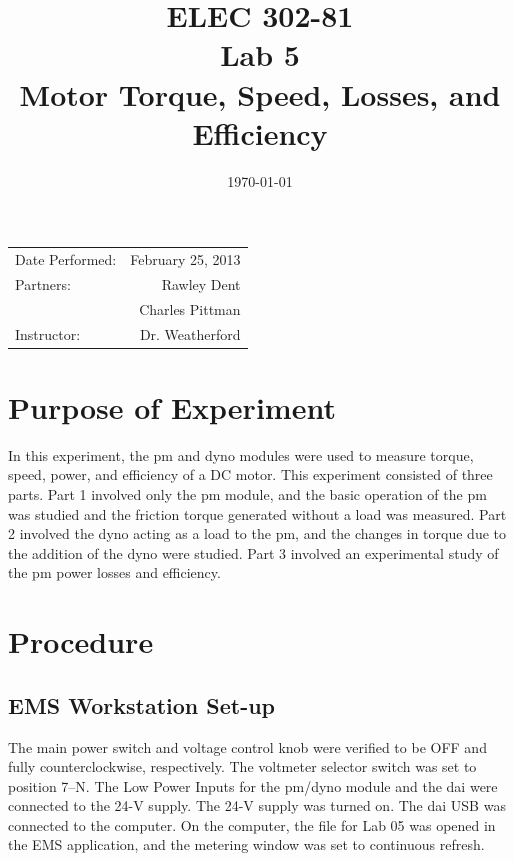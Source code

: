\documentclass{article}
\author{}
\title{ELEC 302-81\\ Lab 5\\ Motor Torque, Speed, Losses, and Efficiency}
\date{\today}
\begin{document}
\maketitle

\begin{center}
  \begin{tabular}{lr}
    Date Performed: & February 25, 2013 \\
    Partners: & Rawley Dent \\
              & Charles Pittman \\
    Instructor: & Dr. Weatherford
  \end{tabular}
\end{center}

\pagebreak


\section{Purpose of Experiment}

In this experiment, the \gls{pm} and \gls{dyno} modules were used to measure
torque, speed, power, and efficiency of a DC motor. This experiment consisted
of three parts. Part 1 involved only the \gls{pm} module, and the basic
operation of the \gls{pm} was studied and the friction torque generated without
a load was measured. Part 2 involved the \gls{dyno} acting as a load to the
\gls{pm}, and the changes in torque due to the addition of the \gls{dyno} were
studied. Part 3 involved an experimental study of the \gls{pm} power losses and
efficiency.

\section{Procedure}

\subsection{EMS Workstation Set-up}

The main power switch and voltage control knob were verified to be OFF and
fully counterclockwise, respectively. The voltmeter selector switch was set to
position 7--N. The Low Power Inputs for the \gls{pm}/\gls{dyno} module and the
\gls{dai} were connected to the 24-V supply. The 24-V supply was turned on. The
\gls{dai} USB was connected to the computer. On the computer, the file for Lab
05 was opened in the EMS application, and the metering window was set to
continuous refresh.
\end{document}
